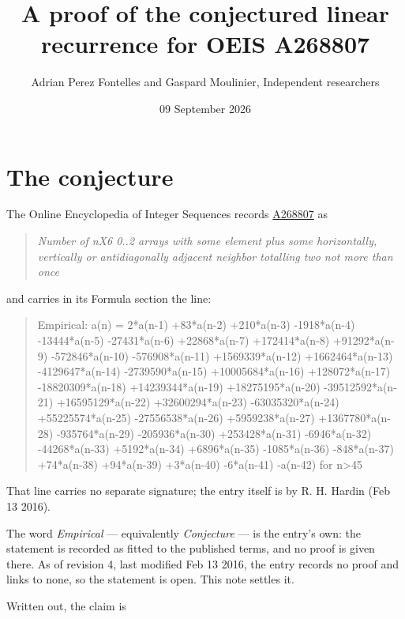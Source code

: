 \documentclass[11pt]{article}
\title{A proof of the conjectured linear recurrence for OEIS A268807}
\author{Adrian Perez Fontelles and Gaspard Moulinier, Independent researchers}
\date{09 September 2026}
\theoremstyle{definition}
\begin{document}
\maketitle
\section{The conjecture}

The Online Encyclopedia of Integer Sequences records \href{https://oeis.org/A268807}{A268807} as

\begin{quote}\itshape Number of nX6 0..2 arrays with some element plus some horizontally, vertically or antidiagonally adjacent neighbor totalling two not more than once\end{quote}

and carries in its Formula section the line:

\begin{quote}\ttfamily Empirical: a(n) = 2*a(n-1) +83*a(n-2) +210*a(n-3) -1918*a(n-4) -13444*a(n-5) -27431*a(n-6) +22868*a(n-7) +172414*a(n-8) +91292*a(n-9) -572846*a(n-10) -576908*a(n-11) +1569339*a(n-12) +1662464*a(n-13) -4129647*a(n-14) -2739590*a(n-15) +10005684*a(n-16) +128072*a(n-17) -18820309*a(n-18) +14239344*a(n-19) +18275195*a(n-20) -39512592*a(n-21) +16595129*a(n-22) +32600294*a(n-23) -63035320*a(n-24) +55225574*a(n-25) -27556538*a(n-26) +5959238*a(n-27) +1367780*a(n-28) -935764*a(n-29) -205936*a(n-30) +253428*a(n-31) -6946*a(n-32) -44268*a(n-33) +5192*a(n-34) +6896*a(n-35) -1085*a(n-36) -848*a(n-37) +74*a(n-38) +94*a(n-39) +3*a(n-40) -6*a(n-41) -a(n-42) for n>45\end{quote}

That line carries no separate signature; the entry itself is by R. H. Hardin (Feb 13 2016).

The word {\itshape Empirical} --- equivalently {\itshape Conjecture} --- is the entry's own: the statement is recorded as fitted to the published terms, and no proof is given there. As of revision 4, last modified Feb 13 2016, the entry records no proof and links to none, so the statement is open. This note settles it.

Written out, the claim is
\end{document}

